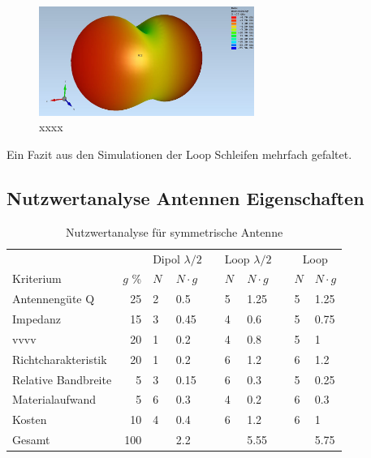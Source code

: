 \begin{figure}[h]
	\centering
	\includegraphics[width=7cm]{content/bilder/Evaluation/Loop/Kurz3/EMFraField_Loop_2ABS_kurz3.JPG}%
	\caption{xxxx}
	\label{xxx}
\end{figure}

Ein Fazit aus den Simulationen der Loop Schleifen mehrfach gefaltet.
\newpage
\subsection{Nutzwertanalyse Antennen Eigenschaften }
\begin{table}[!ht]
  \centering
  \begin{tabular}{l r l l l l l l l l} \toprule 
  && \multicolumn{2}{c}{Dipol $\lambda/2$}   && \multicolumn{2}{c}{Loop $\lambda/2$}   && \multicolumn{2}{c}{Loop} \\ \cmidrule{3-4} \cmidrule{6-7} \cmidrule{9-10}
  Kriterium                  & $g$ \%  & $N$ & $N\cdot g$               && $N$ & $N\cdot g$                  && $N$ & $N\cdot g$ \\ \midrule
  Antennengüte Q            &  25             & 2   & 0.5               && 5   & 1.25                        && 5   & 1.25 \\
  Impedanz                  &  15             & 3   & 0.45              && 4   & 0.6                         && 5   & 0.75 \\
  vvvv    &  20             & 1   & 0.2               && 4   & 0.8                         && 5   & 1 \\
  Richtcharakteristik       &  20             & 1   & 0.2               && 6   & 1.2                         && 6   & 1.2 \\
  Relative Bandbreite       &   5             & 3   & 0.15              && 6   & 0.3                         && 5   & 0.25 \\
  Materialaufwand           &   5             & 6   & 0.3               && 4   & 0.2                         && 6   & 0.3 \\
  Kosten                    &  10             & 4   & 0.4               && 6   & 1.2                         && 6   & 1 \\
  Gesamt                    & 100             &     & 2.2               &&     & 5.55                        &&     & 5.75 \\ \bottomrule
  \end{tabular}
  \caption{Nutzwertanalyse für symmetrische Antenne}
  \label{nutzwertEvaluation}
\end{table}
\newpage 
\thispagestyle{empty}


